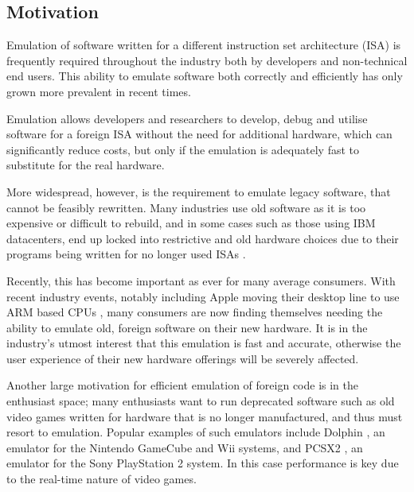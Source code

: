 \subsection{Motivation}

Emulation of software written for a different instruction set architecture (ISA) is frequently required throughout the industry both by developers and non-technical end users. This ability to emulate software both correctly and efficiently has only grown more prevalent in recent times.  

Emulation allows developers and researchers to develop, debug and utilise software for a foreign ISA without the need for additional hardware, which can significantly reduce costs, but only if the emulation is adequately fast to substitute for the real hardware.

More widespread, however, is the requirement to emulate legacy software, that cannot be feasibly rewritten. Many industries use old software as it is too expensive or difficult to rebuild, and in some cases such as those using IBM datacenters, end up locked into restrictive and old hardware choices due to their programs being written for no longer used ISAs . 

Recently, this has become important as ever for many average consumers. With recent industry events, notably including Apple moving their desktop line to use ARM based CPUs , many consumers are now finding themselves needing the ability to emulate old, foreign software on their new hardware. It is in the industry's utmost interest that this emulation is fast and accurate, otherwise the user experience of their new hardware offerings will be severely affected.

Another large motivation for efficient emulation of foreign code is in the enthusiast space; many enthusiasts want to run deprecated software such as old video games written for hardware that is no longer manufactured, and thus must resort to emulation. Popular examples of such emulators include Dolphin \cite{dolphin}, an emulator for the Nintendo GameCube and Wii systems, and PCSX2 \cite{PCSX2}, an emulator for the Sony PlayStation 2 system. In this case performance is key due to the real-time nature of video games.

